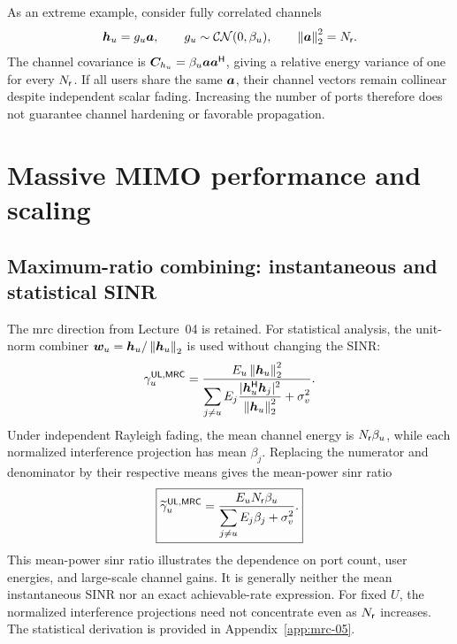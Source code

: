 As an extreme example, consider fully correlated channels
\begin{equation*}
	\bm{h}_u=g_u\bm{a},
	\qquad
	g_u\sim\mathcal{CN}(0,\beta_u),
	\qquad
	\left\|\bm{a}\right\|_2^2=N_{\mathsf{r}}.
\end{equation*}
The channel covariance is $\bm{C}_{h_u}=\beta_u\bm{a}{\bm{a}}^{\mathsf{H}}$, giving a relative energy variance of one for every $N_{\mathsf{r}}$. If all users share the same $\bm{a}$, their channel vectors remain collinear despite independent scalar fading. Increasing the number of ports therefore does not guarantee channel hardening or favorable propagation.



\section{Massive MIMO performance and scaling}
\label{sec:performance-05}

\subsection{Maximum-ratio combining: instantaneous and statistical SINR}
The \ac{mrc} direction from Lecture~04 is retained. For statistical analysis, the unit-norm combiner $\bm{w}_u=\bm{h}_u/\left\|\bm{h}_u\right\|_2$ is used without changing the SINR:
\begin{equation}
	\gamma_u^{\mathsf{UL},\mathsf{MRC}}
	=\frac{E_u\left\|\bm{h}_u\right\|_2^2}
	{\displaystyle\sum_{j\ne u}E_j
		\frac{|{\bm{h}}^{\mathsf{H}}_u\bm{h}_j|^2}{\left\|\bm{h}_u\right\|_2^2}
		+\sigma_v^2}.
	\label{eq:mrcinstant-05}
\end{equation}
Under independent Rayleigh fading, the mean channel energy is $N_{\mathsf{r}}\beta_u$, while each normalized interference projection has mean $\beta_j$. Replacing the numerator and denominator by their respective means gives the  mean-power \ac{sinr} ratio
\begin{equation}
	\boxed{
		\widetilde\gamma_u^{\mathsf{UL},\mathsf{MRC}}
		=\frac{E_uN_{\mathsf{r}}\beta_u}
		{\displaystyle\sum_{j\ne u}E_j\beta_j+\sigma_v^2}.
	}
	\label{eq:mrcproxy-05}
\end{equation}
This mean-power \ac{sinr} ratio  illustrates the dependence on port count, user energies, and large-scale channel gains. It is generally neither the mean instantaneous SINR nor an exact achievable-rate expression. For fixed $U$, the normalized interference projections need not concentrate even as $N_{\mathsf{r}}$ increases. The statistical derivation is provided in Appendix~\ref{app:mrc-05}. 

